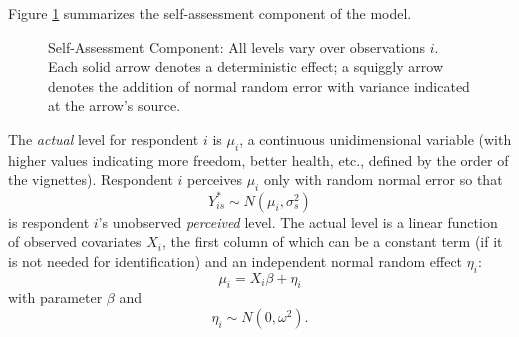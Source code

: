\documentclass{amsart}
\begin{document}
Figure \ref{f:self} summarizes the self-assessment component of the
model.
\begin{figure}[t]
  \begin{center}
    \caption{\label{f:self}Self-Assessment Component: All levels vary
      over observations $i$.  Each solid arrow denotes a deterministic
      effect; a squiggly arrow denotes the addition of normal random
      error with variance indicated at the arrow's source.}
  \end{center}
\end{figure}

The \emph{actual} level for respondent $i$ is $\mu_i$, a continuous
unidimensional variable (with higher values indicating more freedom,
better health, etc., defined by the order of the vignettes).
Respondent $i$ perceives $\mu_i$ only with random normal error so that
\begin{equation}
  \label{stoch-s}
  Y_{is}^* \sim N(\mu_i,\sigma^2_s)
\end{equation}
is respondent $i$'s unobserved \emph{perceived} level.  The actual
level is a linear function of observed covariates $X_i$, the first
column of which can be a constant term (if it is not needed for
identification) and an independent normal random effect $\eta_i$:
\begin{equation}
  \label{syst-s}
  \mu_i = X_i\beta + \eta_i
\end{equation}
with parameter $\beta$ and
\begin{equation}
  \label{re}
  \eta_i \sim N(0,\omega^2).
\end{equation}
\end{document}
